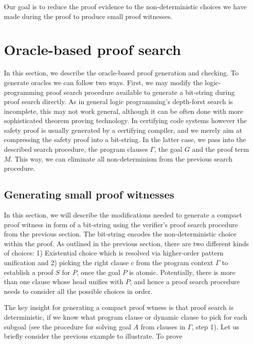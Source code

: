 \documentclass{acmconf}
\begin{document}
 Our goal is to reduce the proof evidence to the
non-deterministic choices we have made during the proof to produce
small proof witnesses.  
      
\section{Oracle-based proof search}
\label{sec:oracles}

In this section, we describe the oracle-based proof generation and
checking. To generate oracles we can follow two ways. First, we may
modify the logic-programming proof search procedure available to generate
a bit-string during proof search directly. As in general logic
programming's depth-forst search is incomplete, this may not work
general, although it can be often done with more sophisticated theorem
proving  technology. In certifying code systems however the safety proof is
usually generated by a certifying compiler, and we merely aim at
compressing the safety proof into a bit-string. In the latter case, we
pass into the described search procedure, the program clauses
$\Gamma$, the goal $G$ and the proof term $M$. This way, we can
eliminate all non-determinism from the previous search procedure.

\subsection{Generating small proof witnesses}

In this section, we will describe the modifications needed to generate
a compact proof witness in form of a bit-string using the verifier's
proof search procedure from the previous section. The bit-string
encodes the non-deterministic choice within the proof. As outlined in
the previous section, there are two different kinds of choices: 1)
Existential choice which is resolved via higher-order pattern
unification and 2) picking the right clause $c$ from the
program context $\Gamma$ to establish a proof $S$ for $P$, once the
goal $P$ is atomic. Potentially, there is more than one clause whose head
unifies with $P$, and hence a proof search procedure needs to consider
all the possible choices in order.  

The key insight for generating a compact proof wtness is that proof
search is deterministic, if we know what program clause or dynamic
clause to pick for each subgoal (see the procedure for solving goal
$A$ from clauses in $\Gamma$, step 1). Let us briefly consider the
previous example to illustrate. To prove
\end{document}
